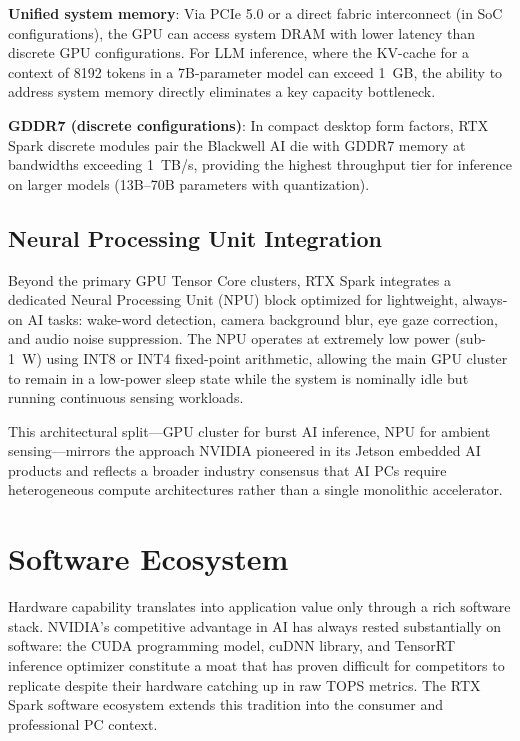 \documentclass[conference]{IEEEtran}
\begin{document}
\textbf{Unified system memory}: Via PCIe 5.0 or a direct fabric interconnect (in SoC configurations), the GPU can access system DRAM with lower latency than discrete GPU configurations. For LLM inference, where the KV-cache for a context of 8192 tokens in a 7B-parameter model can exceed 1~GB, the ability to address system memory directly eliminates a key capacity bottleneck.

\textbf{GDDR7 (discrete configurations)}: In compact desktop form factors, RTX Spark discrete modules pair the Blackwell AI die with GDDR7 memory at bandwidths exceeding 1~TB/s, providing the highest throughput tier for inference on larger models (13B--70B parameters with quantization).

\subsection{Neural Processing Unit Integration}

Beyond the primary GPU Tensor Core clusters, RTX Spark integrates a dedicated Neural Processing Unit (NPU) block optimized for lightweight, always-on AI tasks: wake-word detection, camera background blur, eye gaze correction, and audio noise suppression. The NPU operates at extremely low power (sub-1~W) using INT8 or INT4 fixed-point arithmetic, allowing the main GPU cluster to remain in a low-power sleep state while the system is nominally idle but running continuous sensing workloads.

This architectural split---GPU cluster for burst AI inference, NPU for ambient sensing---mirrors the approach NVIDIA pioneered in its Jetson embedded AI products and reflects a broader industry consensus that AI PCs require heterogeneous compute architectures rather than a single monolithic accelerator.

\section{Software Ecosystem}
\label{sec:software}

Hardware capability translates into application value only through a rich software stack. NVIDIA's competitive advantage in AI has always rested substantially on software: the CUDA programming model, cuDNN library, and TensorRT inference optimizer constitute a moat that has proven difficult for competitors to replicate despite their hardware catching up in raw TOPS metrics. The RTX Spark software ecosystem extends this tradition into the consumer and professional PC context.
\end{document}
